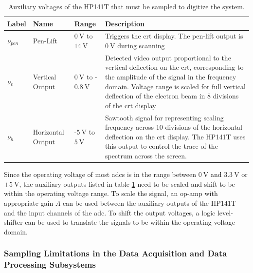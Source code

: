 \documentclass[class=report,11pt,crop=false]{standalone}
\begin{document}
	\begin{table}[!ht]
		\centering
		\begin{tabular}{|m{3em}|m{5em}|m{8em}|m{25em}|}
			\hline
			\cellcolor{cyan!25}\textbf{Label} & \cellcolor{cyan!25}\textbf{Name} & \cellcolor{cyan!25}\textbf{Range} & \cellcolor{cyan!25}\textbf{Description}\\
			\hline
			$\nu_{pen}$	& Pen-Lift	&$\SI{0}{\volt}$ to $\SI{14}{\volt}$ & Triggers the \acrshort{crt} display. The pen-lift output is $\SI{0}{\volt}$ during scanning\\
			\hline
			$\nu_{v}$	& Vertical Output	& $\SI{0}{\volt}$ to -$\SI{0.8}{\volt}$	& Detected video output proportional to the vertical deflection on the \acrshort{crt}, corresponding to the amplitude of the signal in the frequency domain. Voltage range is scaled for full vertical deflection of the electron beam in 8 divisions of the \acrshort{crt} display \\
			\hline
			$\nu_{h}$	& Horizontal Output	& -$\SI{5}{\volt}$ to $\SI{5}{\volt}$ & Sawtooth signal for representing scaling frequency across 10 divisions of the horizontal deflection on the \acrshort{crt} display. The HP141T uses this output to control the trace of the spectrum across the screen. \\
			\hline
		\end{tabular}
		\label{tab:hp141t-output-voltages}
		\caption{Auxiliary voltages of the HP141T that must be sampled to digitize the system.}
	\end{table}

	Since the operating voltage of most \acrshort{adc}s is in the range between $\SI{0}{\volt}$ and $\SI{3.3}{\volt}$ or $\pm\SI{5}{\volt}$, the auxiliary outputs listed in table \ref{tab:hp141t-output-voltages} need to be scaled and shift to be within the operating voltage range. To scale the signal, an op-amp with appropriate gain $A$ can be used between the auxiliary outputs of the HP141T and the input channels of the \acrshort{adc}. To shift the output voltages, a logic level-shifter can be used to translate the signals to be within the operating voltage domain. 

	\subsubsection{Sampling Limitations in the Data Acquisition and Data Processing Subsystems}
		
\end{document}
